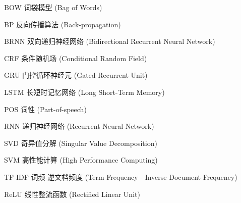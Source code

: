 \begin{denotation}[3cm]

\item[BOW] 词袋模型 (Bag of Words)
\item[BP] 反向传播算法 (Back-propagation)
\item[BRNN] 双向递归神经网络 (Bidirectional Recurrent Neural Network)
\item[CRF] 条件随机场 (Conditional Random Field)
\item[GRU] 门控循环神经元 (Gated Recurrent Unit)
\item[LSTM] 长短时记忆网络 (Long Short-Term Memory)
\item[POS] 词性 (Part-of-speech)
\item[RNN] 递归神经网络 (Recurrent Neural Network)
\item[SVD] 奇异值分解 (Singular Value Decomposition)
\item[SVM] 高性能计算 (High Performance Computing)
\item[TF-IDF] 词频-逆文档频度 (Term Frequency - Inverse Document Frequency)
\item[ReLU] 线性整流函数 (Rectified Linear Unit)

\end{denotation}

